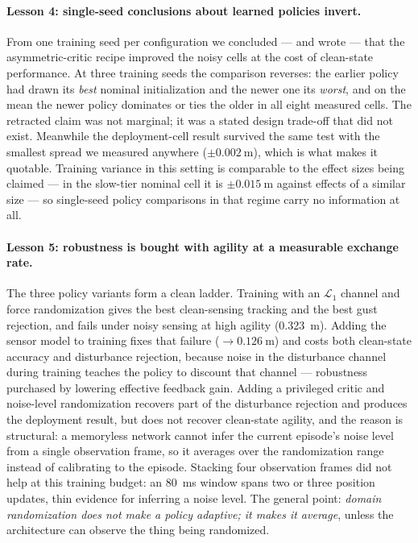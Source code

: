 \paragraph{Lesson 4: single-seed conclusions about learned policies invert.}
From one training seed per configuration we concluded --- and wrote --- that the
asymmetric-critic recipe improved the noisy cells at the cost of clean-state
performance. At three training seeds the comparison reverses: the earlier policy had
drawn its \emph{best} nominal initialization and the newer one its \emph{worst}, and on
the mean the newer policy dominates or ties the older in all eight measured cells. The
retracted claim was not marginal; it was a stated design trade-off that did not exist.
Meanwhile the deployment-cell result survived the same test with the smallest spread we
measured anywhere ($\pm\SI{0.002}{\meter}$), which is what makes it quotable. Training
variance in this setting is comparable to the effect sizes being claimed --- in the
slow-tier nominal cell it is $\pm\SI{0.015}{\meter}$ against effects of a similar size
--- so single-seed policy comparisons in that regime carry no information at all.

\paragraph{Lesson 5: robustness is bought with agility at a measurable exchange rate.}
The three policy variants form a clean ladder. Training with an $\mathcal{L}_1$ channel
and force randomization gives the best clean-sensing tracking and the best gust
rejection, and fails under noisy sensing at high agility (\SI{0.323}{\meter}). Adding
the sensor model to training fixes that failure ($\rightarrow\SI{0.126}{\meter}$) and
costs both clean-state accuracy and disturbance rejection, because noise in the
disturbance channel during training teaches the policy to discount that channel ---
robustness purchased by lowering effective feedback gain. Adding a privileged critic and
noise-level randomization recovers part of the disturbance rejection and produces the
deployment result, but does not recover clean-state agility, and the reason is
structural: a memoryless network cannot infer the current episode's noise level from a
single observation frame, so it averages over the randomization range instead of
calibrating to the episode. Stacking four observation frames did not help at this
training budget: an \SI{80}{\milli\second} window spans two or three position updates,
thin evidence for inferring a noise level. The general point:
\emph{domain randomization does not make a policy adaptive; it makes it average}, unless
the architecture can observe the thing being randomized.

